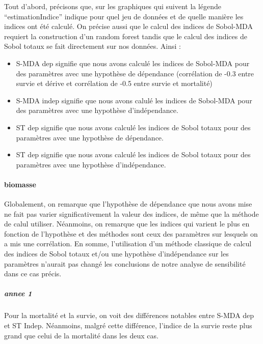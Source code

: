 \documentclass[
]{article}
\begin{document}
Tout d'abord, précisons que, sur les graphiques qui suivent la légende
``estimationIndice'' indique pour quel jeu de données et de quelle
manière les indices ont été calculé. On précise aussi que le calcul des
indices de Sobol-MDA requiert la construction d'un random forest tandis
que le calcul des indices de Sobol totaux se fait directement sur nos
données. Ainsi :

\begin{itemize}
\item
  S-MDA dep signifie que nous avons calculé les indices de Sobol-MDA
  pour des paramètres avec une hypothèse de dépendance (corrélation de
  -0.3 entre survie et dérive et corrélation de -0.5 entre survie et
  mortalité)
\item
  S-MDA indep signifie que nous avons calulé les indices de Sobol-MDA
  pour des paramètres avec une hypothèse d'indépendance.
\item
  ST dep signifie que nous avons calculé les indices de Sobol totaux
  pour des paramètres avec une hypothèse de dépendance.
\item
  ST dep signifie que nous avons calculé les indices de Sobol totaux
  pour des paramètres avec une hypothèse d'indépendance.
\end{itemize}

\hypertarget{biomasse-8}{%
\paragraph{biomasse}\label{biomasse-8}}

Globalement, on remarque que l'hypothèse de dépendance que nous avons
mise ne fait pas varier significativement la valeur des indices, de même
que la méthode de calul utiliser. Néanmoins, on remarque que les indices
qui varient le plus en fonction de l'hypothèse et des méthodes sont ceux
des paramètres sur lesquels on a mis une corrélation. En somme,
l'utilisation d'un méthode classique de calcul des indices de Sobol
totaux et/ou une hypothèse d'indépendance sur les paramètres n'aurait
pas changé les conclusions de notre analyse de sensibilité dans ce cas
précis.

\hypertarget{annee-1}{%
\subparagraph{annee 1}\label{annee-1}}

Pour la mortalité et la survie, on voit des différences notables entre
S-MDA dep et ST Indep. Néanmoins, malgré cette différence, l'indice de
la survie reste plus grand que celui de la mortalité dans les deux cas.
\end{document}
